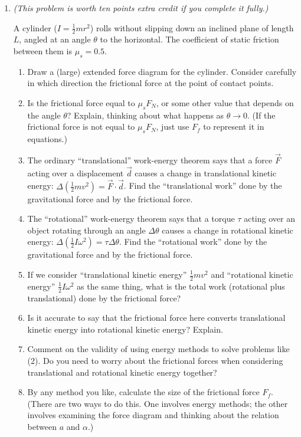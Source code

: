 \documentclass[12pt]{article}
\begin{document}
\begin{enumerate}
\item {\it (This problem is worth ten points extra credit if you complete it fully.)}

A cylinder ($I=\frac{1}{2}mr^2$) rolls without slipping down an inclined plane of length $L$, angled at an angle $\theta$ to the horizontal. The 
coefficient of static friction between them is $\mu_s=0.5$.

\begin{enumerate}

\item Draw a (large) extended force diagram for the cylinder. Consider carefully in which direction the frictional force at the point of contact points. 
\item Is the frictional force equal to $\mu_s F_N$, or some other value that depends on the angle $\theta$? Explain, thinking about what happens as $\theta \rightarrow 0$.
(If the frictional force is not equal to $\mu_s F_N$, just use $F_f$ to represent it in equations.)
\item The ordinary ``translational'' work-energy theorem says that a force $\vec F$ acting over a displacement $\vec d$ causes a change in translational kinetic energy:
$\Delta (\frac{1}{2}mv^2) = \vec F \cdot \vec d$.
Find the ``translational work'' done by the gravitational force and by the frictional force.
\item The ``rotational'' work-energy theorem says that a torque $\tau $ acting over an object rotating through an angle $\Delta \theta$ causes a change in rotational kinetic energy: $\Delta (\frac{1}{2}I\omega^2) = \tau \Delta \theta$. 
Find the ``rotational work'' done by the gravitational force and by the frictional force.
\item If we consider ``translational kinetic energy'' $\frac{1}{2}mv^2$ and ``rotational kinetic energy'' $\frac{1}{2}I\omega^2$ as the same thing, what is the total
work (rotational plus translational) done by the frictional force?
\item Is it accurate to say that the frictional force here converts translational kinetic energy into rotational kinetic energy? Explain.
\item Comment on the validity of using energy methods to solve problems like (2). Do you need to worry about the frictional forces when considering translational
and rotational kinetic energy together?
\item By any method you like, calculate the size of the frictional force $F_f$. (There are two ways to do this. One involves energy methods; the other involves
examining the force diagram and thinking about the relation between $a$ and $\alpha$.)
\end{enumerate}
\end{enumerate}
    
    
\end{document}
